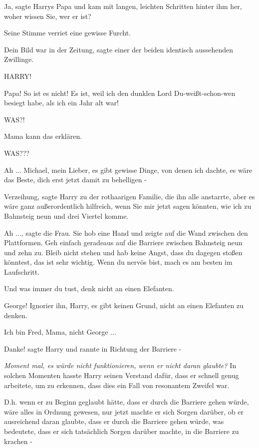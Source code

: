 \glqq{}Ja\grqq{}, sagte Harrys Papa und kam mit langen, leichten Schritten
hinter ihm her, \glqq{}woher wissen Sie, wer er ist?\grqq{}

Seine Stimme verriet eine gewisse Furcht.

\glqq{}Dein Bild war in der Zeitung\grqq{}, sagte einer der beiden identisch
aussehenden Zwillinge.

\glqq{}HARRY!\grqq{}

\glqq{}Papa! So ist es nicht! Es ist, weil ich den dunklen Lord
Du-weißt-schon-wen besiegt habe, als ich ein Jahr alt war!\grqq{}

\glqq{}WAS?!\grqq{}

\glqq{}Mama kann das erklären.\grqq{}

\glqq{}WAS???\grqq{}

\glqq{}Ah ... Michael, mein Lieber, es gibt gewisse Dinge, von denen ich dachte,
es wäre das Beste, dich erst jetzt damit zu behelligen -\grqq{}

\glqq{}Verzeihung\grqq{}, sagte Harry zu der rothaarigen Familie, die ihn alle
anstarrte, \glqq{}aber es wäre ganz außerordentlich hilfreich, wenn Sie mir
jetzt sagen könnten, wie ich zu Bahnsteig neun und drei Viertel komme.\grqq{}

\glqq{}Ah ...\grqq{}, sagte die Frau. Sie hob eine Hand und zeigte auf die Wand
zwischen den Plattformen. \glqq{}Geh einfach geradeaus auf die Barriere zwischen
Bahnsteig neun und zehn zu. Bleib nicht stehen und hab keine Angst, dass du
dagegen stoßen könntest, das ist sehr wichtig. Wenn du nervös bist, mach es am
besten im Laufschritt.\grqq{}

\glqq{}Und was immer du tust, denk nicht an einen Elefanten.\grqq{}

\glqq{}George! Ignorier ihn, Harry, es gibt keinen Grund, nicht an einen
Elefanten zu denken.\grqq{}

\glqq{}Ich bin Fred, Mama, nicht George ...\grqq{}

\glqq{}Danke!\grqq{} sagte Harry und rannte in Richtung der Barriere -

\emph{Moment mal, es würde nicht funktionieren, wenn er nicht daran glaubte?} In
solchen Momenten hasste Harry seinen Verstand dafür, dass er schnell genug
arbeitete, um zu erkennen, dass dies ein Fall von \glqq{}resonantem
Zweifel\grqq{} war.

D.h. wenn er zu Beginn geglaubt hätte, dass er durch die Barriere gehen würde,
wäre alles in Ordnung gewesen, nur jetzt machte er sich Sorgen darüber, ob er
ausreichend daran glaubte, dass er durch die Barriere gehen würde, was
bedeutete, dass er sich tatsächlich Sorgen darüber machte, in die Barriere zu
krachen -

